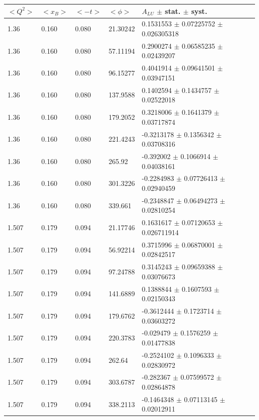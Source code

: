 \begin{table}[!h]
   \begin{center}
      \begin{tabular}{||l|l|l|l|l||}
         \hline
 $<Q^{2}>$ & $<x_{B}>$ & $<-t>$ & $<\phi>$ & $A_{LU}$ $\pm$ stat. $\pm$ syst.\\

         \hline
           1.36 & 0.160 & 0.080 &   21.30242  &  0.1531553   $\pm$  0.07225752   $\pm$  0.026305318    \\
           1.36 & 0.160 & 0.080 &   57.11194  &  0.2900274   $\pm$  0.06585235   $\pm$  0.02439207     \\
           1.36 & 0.160 & 0.080 &   96.15277  &  0.4041914   $\pm$  0.09641501   $\pm$  0.03947151     \\
           1.36 & 0.160 & 0.080 &   137.9588  &  0.1402594   $\pm$  0.1434757    $\pm$  0.02522018     \\
           1.36 & 0.160 & 0.080 &   179.2052  &  0.3218006   $\pm$  0.1641379    $\pm$  0.03717874     \\
           1.36 & 0.160 & 0.080 &   221.4243  &  -0.3213178  $\pm$  0.1356342    $\pm$  0.03708316     \\
           1.36 & 0.160 & 0.080 &   265.92    &  -0.392002   $\pm$  0.1066914    $\pm$  0.04038161     \\
           1.36 & 0.160 & 0.080 &   301.3226  &  -0.2284983  $\pm$  0.07726413   $\pm$  0.02940459     \\
           1.36 & 0.160 & 0.080 &   339.661   &  -0.2348847  $\pm$  0.06494273   $\pm$  0.02810254     \\
         \hline                                                                         
           1.507 & 0.179 & 0.094 &  21.17746   & 0.1631617   $\pm$  0.07120653   $\pm$  0.026711914     \\
           1.507 & 0.179 & 0.094 &  56.92214   & 0.3715996   $\pm$  0.06870001   $\pm$  0.02842517      \\
           1.507 & 0.179 & 0.094 &  97.24788   & 0.3145243   $\pm$  0.09659388   $\pm$  0.03076673      \\
           1.507 & 0.179 & 0.094 &  141.6889   & 0.1388844   $\pm$  0.1607593    $\pm$  0.02150343      \\
           1.507 & 0.179 & 0.094 &  179.6762   & -0.3612444  $\pm$  0.1723714    $\pm$  0.03603272      \\
           1.507 & 0.179 & 0.094 &  220.3783   & -0.029479   $\pm$  0.1576259    $\pm$  0.01477838      \\
           1.507 & 0.179 & 0.094 &  262.64     & -0.2524102  $\pm$  0.1096333    $\pm$  0.02830972      \\
           1.507 & 0.179 & 0.094 &  303.6787   & -0.282367   $\pm$  0.07599572   $\pm$  0.02864878      \\
           1.507 & 0.179 & 0.094 &  338.2113   & -0.1464348  $\pm$  0.07113145   $\pm$  0.02012911      \\
         \hline
                                                                       

\end{tabular}
\end{center}
\end{table}
